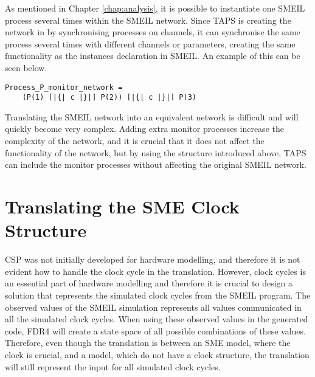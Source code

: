 As mentioned in Chapter \ref{chap:analysis}, it is possible to instantiate one SMEIL process several times within the SMEIL network. Since TAPS is creating the network in \cspm{} by synchronising processes on channels, it can synchronise the same process several times with different channels or parameters, creating the same functionality as the instances declaration in SMEIL. An example of this can be seen below.\\ \begin{verbatim}
Process_P_monitor_network =
    (P(1) [|{| c |}|] P(2)) [|{| c |}|] P(3)
\end{verbatim}

Translating the SMEIL network into an equivalent \cspm{} network is difficult and will quickly become very complex. Adding extra monitor processes increase the complexity of the network, and it is crucial that it does not affect the functionality of the network, but by using the structure introduced above, TAPS can include the monitor processes without affecting the original SMEIL network.


\section{Translating the SME Clock Structure}
CSP was not initially developed for hardware modelling, and therefore it is not evident how to handle the clock cycle in the translation. However, clock cycles is an essential part of hardware modelling and therefore it is crucial to design a solution that represents the simulated clock cycles from the SMEIL program. The observed values of the SMEIL simulation represents all values communicated in all the simulated clock cycles.
When using these observed values in the generated \cspm{} code, FDR4 will create a state space of all possible combinations of these values.
Therefore, even though the translation is between an SME model, where the clock is crucial, and a \cspm{} model, which do not have a clock structure, the translation will still represent the input for all simulated clock cycles.




